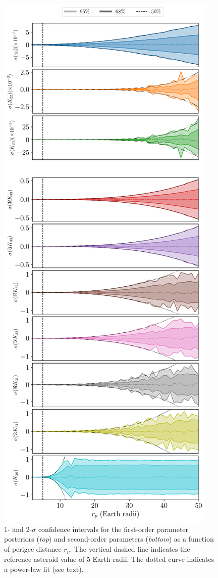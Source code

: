 \documentclass[fleqn,usenatbib]{mnras}
\begin{document}
\begin{figure}
  \centering
  \includegraphics[height=0.89\textheight]{figs/scan-perigee.pdf}
  \caption{1- and 2-$\sigma$ confidence intervals for the first-order parameter posteriors (\textit{top}) and second-order parameters (\textit{bottom}) as a function of perigee distance $r_p$. The vertical dashed line indicates the reference asteroid value of 5 Earth radii. The dotted curve indicates a power-law fit (see text).}
  \label{fig:scan-perigee}
\end{figure}
\end{document}
